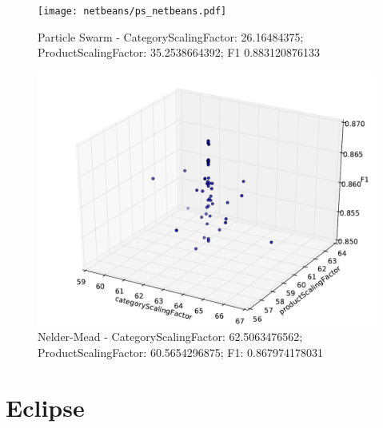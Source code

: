\documentclass{article}
\begin{document}
\begin{figure}[!htb]
\centering
\texttt{[image: netbeans/ps\_netbeans.pdf]}
\caption{Particle Swarm - CategoryScalingFactor: 26.16484375; ProductScalingFactor: 35.2538664392; F1 0.883120876133 }
\label{fig:NParticle-Swarm}
\end{figure}

\begin{figure}[!htb]
\centering
\includegraphics[width=\textwidth]{netbeans/nm_netbeans.pdf}
\caption{Nelder-Mead - CategoryScalingFactor: 62.5063476562; ProductScalingFactor: 60.5654296875; F1: 0.867974178031}
\label{fig:NNelder-Mead}
\end{figure}


\section{Eclipse}
\end{document}
